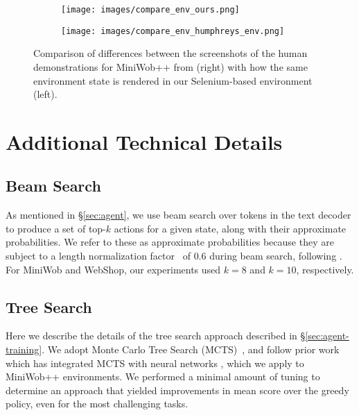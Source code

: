 \begin{figure}[h!]
\centering
\begin{subfigure}[h]{0.45\textwidth}
\centering
\texttt{[image: images/compare\_env\_ours.png]}
\end{subfigure}
\begin{subfigure}[h]{0.45\textwidth}
\centering
\texttt{[image: images/compare\_env\_humphreys\_env.png]} %
\end{subfigure}
\caption{Comparison of  differences between the screenshots of the human demonstrations for MiniWob++ from \cite{humphreys2022data} (right) with how the same environment state is rendered in our Selenium-based environment (left).} 
\label{fig:render_diff}
\end{figure}




\section{Additional Technical Details}
\label{sec:appendix-b}

\subsection{Beam Search}
\label{sec:appendix-beam}
As mentioned in \S\ref{sec:agent}, we use beam search over tokens in the text decoder to produce a set of top-$k$ actions for a given state, along with their approximate probabilities. We refer to these as approximate probabilities because they are subject to a length normalization factor~\citep{wu2016google} of $0.6$ during beam search, following \citet{raffel2019exploring}. For MiniWob and WebShop, our experiments used $k=8$ and $k=10$, respectively.

\subsection{Tree Search}
\label{sec:appendix-mcts} Here we describe the details of the tree search approach described in \S\ref{sec:agent-training}. We adopt Monte Carlo Tree Search (MCTS)~\citep{Coulom2006EfficientSA}, and follow prior work which has integrated MCTS with neural networks \citep{silver2017mastering,anthony2017thinking}, which we apply to MiniWob++ environments. We performed a minimal amount of tuning to determine an approach that yielded improvements in mean score over the greedy policy, even for the most challenging tasks.

